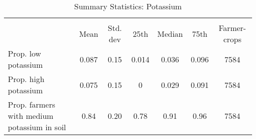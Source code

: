 \begin{table}[htbp]\centering
\def\sym#1{\ifmmode^{#1}\else\(^{#1}\)\fi}
\caption{Summary Statistics: Potassium\label{tab:sumstats}}
\begin{tabular}{l*{1}{cccccc}}
\toprule
                    &\multicolumn{6}{c}{}                                                         \\
                    &        Mean&    Std. dev&        25th&      Median&        75th&Farmer-crops\\
\midrule
Prop. low potassium &       0.087&        0.15&       0.014&       0.036&       0.096&        7584\\
Prop. high potassium&       0.075&        0.15&           0&       0.029&       0.091&        7584\\
Prop. farmers with medium potassium in soil&        0.84&        0.20&        0.78&        0.91&        0.96&        7584\\
\bottomrule
\end{tabular}
\end{table}
